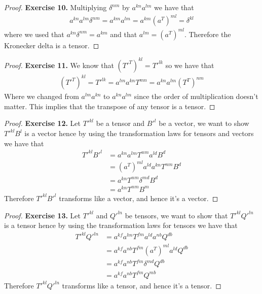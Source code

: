 \documentclass[11pt]{article}
\theoremstyle{definition}
\begin{document}
\begin{proof}{\textbf{Exercise 10.}}
    Multiplying $\delta^{nm}$ by $a^{kn}a^{lm}$ we have that
    \begin{align*}
        a^{kn}a^{lm}\delta^{nm}
        = a^{km}a^{lm} = a^{km}(a^{T})^{ml} = \delta^{kl}
    \end{align*}
    where we used that $a^{kn}\delta^{nm} = a^{km}$ and that
    $a^{lm} = (a^{T})^{ml}$. Therefore the Kronecker delta is a tensor.
\end{proof}
\begin{proof}{\textbf{Exercise 11.}}
    We know that $(T'^{T})^{kl} = T'^{lk}$ so we have that
    \begin{align*}
        (T'^{T})^{kl} = T'^{lk} = a^{lm}a^{kn} T^{mn} = a^{kn}a^{lm} (T^{T})^{nm}
    \end{align*}
    Where we changed from $a^{lm}a^{kn}$ to $a^{kn}a^{lm}$ since the order of
    multiplication doesn't matter. This implies that the
    transpose of any tensor is a tensor.
\end{proof}
\begin{proof}{\textbf{Exercise 12.}}
    Let $T'^{kl}$ be a tensor and $B'^{l}$ be a vector, we want to show
    $T'^{kl}B^{l}$ is a vector hence by using the transformation laws for
    tensors and vectors we have that
    \begin{align*}
        T'^{kl}B'^{l} &= a^{kn}a^{lm}T^{nm}a^{ld}B^d\\
        &= (a^T)^{ml}a^{ld} a^{kn} T^{nm}B^d\\
        &= a^{kn}T^{nm}\delta^{md}B^d\\
        &= a^{kn}T^{nm}B^m
    \end{align*}
    Therefore $T'^{kl}B'^{l}$ transforms like a vector, and hence it's a vector.
\end{proof}
\begin{proof}{\textbf{Exercise 13.}}
    Let $T'^{kl}$ and $Q'^{ln}$ be tensors, we want to show that
    $T'^{kl}Q'^{ln}$ is a tensor hence by using the transformation laws for
    tensors we have that
    \begin{align*}
        T'^{kl}Q'^{ln} &= a^{kf}a^{lm}T^{fm} a^{ld}a^{nb} Q^{db}\\
        &= a^{kf}a^{nb} T^{fm} (a^{T})^{ml} a^{ld}  Q^{db}\\
        &= a^{kf}a^{nb} T^{fm} \delta^{md}Q^{db}\\
        &= a^{kf}a^{nb} T^{fm} Q^{mb}
    \end{align*}
    Therefore $T'^{kl}Q'^{ln}$ transforms like a tensor, and hence it's a tensor.
\end{proof}
\end{document}
